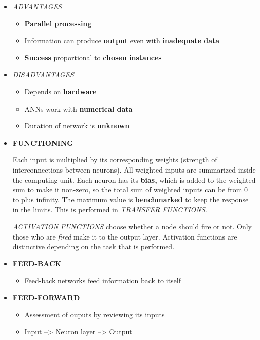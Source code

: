 \documentclass[
  letterpaper,
  DIV=11,
  numbers=noendperiod]{scrartcl}
\providecommand{\tightlist}{%
  \setlength{\itemsep}{0pt}\setlength{\parskip}{0pt}}\usepackage{longtable,booktabs,array}
\begin{document}
\begin{itemize}
\item
  \emph{ADVANTAGES}

  \begin{itemize}
  \item
    \textbf{Parallel processing}
  \item
    Information can produce \textbf{output} even with \textbf{inadequate
    data}
  \item
    \textbf{Success} proportional to \textbf{chosen instances}
  \end{itemize}
\item
  \emph{DISADVANTAGES}

  \begin{itemize}
  \item
    Depends on \textbf{hardware}
  \item
    ANNs work with \textbf{numerical data}
  \item
    Duration of network is \textbf{unknown}
  \end{itemize}
\item
  \textbf{FUNCTIONING}

  Each input is multiplied by its corresponding weights (strength of
  interconnections between neurons). All weighted inputs are summarized
  inside the computing unit. Each neuron has its \textbf{bias,} which is
  added to the weighted sum to make it non-zero, so the total sum of
  weighted inputs can be from 0 to plus infinity. The maximum value is
  \textbf{benchmarked} to keep the response in the limits. This is
  performed in \emph{TRANSFER FUNCTIONS.}

  \emph{ACTIVATION FUNCTIONS} choose whether a node should fire or not.
  Only those who are \emph{fired} make it to the output layer.
  Activation functions are distinctive depending on the task that is
  performed.
\item
  \textbf{FEED-BACK}

  \begin{itemize}
  \tightlist
  \item
    Feed-back networks feed information back to itself
  \end{itemize}
\item
  \textbf{FEED-FORWARD}

  \begin{itemize}
  \item
    Assessment of ouputs by reviewing its inputs
  \item
    Input --\textgreater{} Neuron layer --\textgreater{} Output
  \end{itemize}
\end{itemize}
\end{document}
